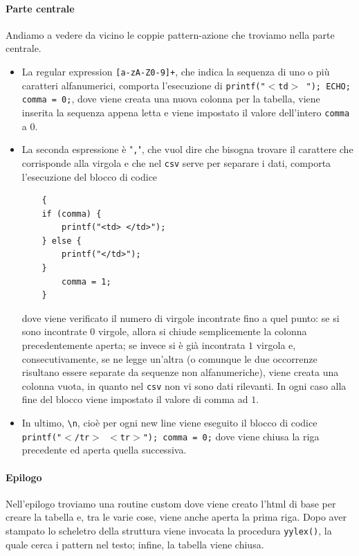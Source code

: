 \documentclass[class=book, crop=false, oneside, 12pt]{standalone}
\begin{document}
\paragraph{Parte centrale}
Andiamo a vedere da vicino le coppie pattern-azione che troviamo nella parte centrale.
\begin{itemize}
    \item La regular expression \texttt{[a-zA-Z0-9]+}, che indica la sequenza di uno o più caratteri alfanumerici, comporta l'esecuzione di \texttt{{printf("\(<\)td\(>\) "); ECHO; comma = 0;}}, dove viene creata una nuova colonna per la tabella, viene inserita la sequenza appena letta e viene impostato il valore dell'intero \texttt{comma} a \(0\).
    \item La seconda espressione è "\texttt{,}", che vuol dire che bisogna trovare il carattere che corrisponde alla virgola e che nel \texttt{csv} serve per separare i dati, comporta l'esecuzione del blocco di codice
    \begin{verbatim}
    {            
    if (comma) {
        printf("<td> </td>"); 
    } else { 
        printf("</td>");
    }       
        comma = 1;
    }
    \end{verbatim}
        
    dove viene verificato il numero di virgole incontrate fino a quel punto: se si sono incontrate 0 virgole, allora si chiude semplicemente la colonna precedentemente aperta; se invece si è già incontrata \(1\) virgola e, consecutivamente, se ne legge un'altra (o comunque le due occorrenze risultano essere separate da sequenze non alfanumeriche), viene creata una colonna vuota, in quanto nel \texttt{csv} non vi sono dati rilevanti. In ogni caso alla fine del blocco viene impostato il valore di comma ad \(1\).
    \item In ultimo, \texttt{\textbackslash n}, cioè per ogni new line viene eseguito il blocco di codice \texttt{{printf("\(<\)/tr\(>\) \n \(<\)tr\(>\)"); comma = 0;}} dove viene chiusa la riga precedente ed aperta quella successiva.
\end{itemize}

\paragraph{Epilogo}
Nell'epilogo troviamo una routine custom dove viene creato l'html di base per creare la tabella e, tra le varie cose, viene anche aperta la prima riga. Dopo aver stampato lo scheletro della struttura viene invocata la procedura \texttt{yylex()}, la quale cerca i pattern nel testo; infine, la tabella viene chiusa.
\end{document}
